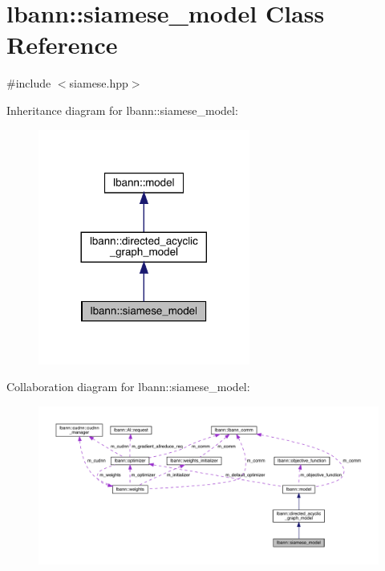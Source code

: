 \hypertarget{classlbann_1_1siamese__model}{}\section{lbann\+:\+:siamese\+\_\+model Class Reference}
\label{classlbann_1_1siamese__model}


{\ttfamily \#include $<$siamese.\+hpp$>$}



Inheritance diagram for lbann\+:\+:siamese\+\_\+model\+:\nopagebreak
\begin{figure}[H]
\begin{center}
\leavevmode
\includegraphics[width=197pt]{classlbann_1_1siamese__model__inherit__graph}
\end{center}
\end{figure}


Collaboration diagram for lbann\+:\+:siamese\+\_\+model\+:\nopagebreak
\begin{figure}[H]
\begin{center}
\leavevmode
\includegraphics[width=350pt]{classlbann_1_1siamese__model__coll__graph}
\end{center}
\end{figure}
